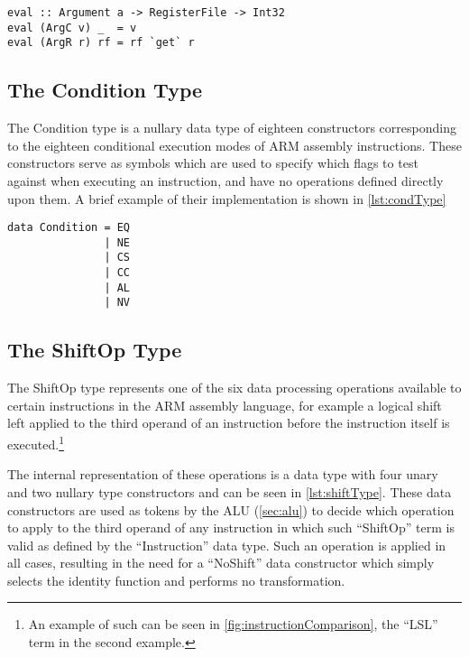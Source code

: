 \begin{lstlisting}[numbers=none,float,caption={The $eval$ function for the Argument type},label={lst:evalFunc}]
eval :: Argument a -> RegisterFile -> Int32
eval (ArgC v) _  = v
eval (ArgR r) rf = rf `get` r
\end{lstlisting}

\subsection{The Condition Type}
\label{subsec:implementation:condition}

The Condition type is a nullary data type of eighteen constructors corresponding to the eighteen conditional execution modes of ARM assembly instructions\citep{hohl:2009}. These constructors serve as symbols which are used to specify which flags to test against when executing an instruction, and have no operations defined directly upon them. A brief example of their implementation is shown in \autoref{lst:condType}

\begin{lstlisting}[numbers=none,float,caption={The Condition data type)},label={lst:condType}]
data Condition = EQ
               | NE
               | CS
               | CC
               | AL
               | NV
\end{lstlisting}

\subsection{The ShiftOp Type}
\label{subsec:shiftop}

The ShiftOp type represents one of the six data processing operations\citep{hohl:2009}\citep{armarm:2005} available to certain instructions in the ARM assembly language, for example a logical shift left applied to the third operand of an instruction before the instruction itself is executed.\footnote{An example of such can be seen in \autoref{fig:instructionComparison}, the ``LSL'' term in the second example.}

The internal representation of these operations is a data type with four unary and two nullary type constructors and can be seen in \autoref{lst:shiftType}. These data constructors are used as tokens by the ALU (\autoref{sec:alu}) to decide which operation to apply to the third operand of any instruction in which such ``ShiftOp'' term is valid as defined by the ``Instruction'' data type. Such an operation is applied in all cases, resulting in the need for a ``NoShift'' data constructor which simply selects the identity function and performs no transformation.

